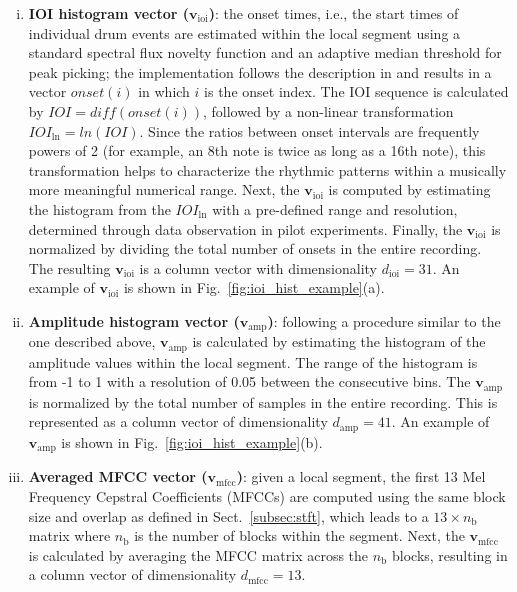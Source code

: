 \documentclass{ws-ijsc}
\begin{document}
\begin{enumerate}[(i)]
    \item   \textbf{IOI histogram vector ($\mathbf{v}_\mathrm{ioi}$)}: the onset times, i.e., the start times of individual drum events are estimated within the local segment using a standard spectral flux novelty function and an adaptive median threshold for peak picking; the implementation follows the description in \cite{Lerch2012} and results in a vector $onset(i)$ in which $i$ is the onset index. The IOI sequence is calculated by $IOI = diff(onset(i))$, followed by a non-linear transformation $IOI_\mathrm{ln} = ln(IOI)$. Since the ratios between onset intervals are frequently powers of 2 (for example, an 8th note is twice as long as a 16th note), this transformation helps to characterize the rhythmic patterns within a musically more meaningful numerical range. Next, the $\mathbf{v}_\mathrm{ioi}$ is computed by estimating the histogram from the $IOI_\mathrm{ln}$ with a pre-defined range and resolution, determined through data observation in pilot experiments. Finally, the $\mathbf{v}_\mathrm{ioi}$ is normalized by dividing the total number of onsets in the entire recording. The resulting $\mathbf{v}_\mathrm{ioi}$ is a column vector with dimensionality $d_\mathrm{ioi} = 31$. An example of  $\mathbf{v}_\mathrm{ioi}$ is shown in Fig.~\ref{fig:ioi_hist_example}(a).

    \item   \textbf{Amplitude histogram vector ($\mathbf{v}_\mathrm{amp}$)}: following a procedure similar to the one described above, $\mathbf{v}_\mathrm{amp}$ is calculated by estimating the histogram of the amplitude values within the local segment. The range of the histogram is from -1 to 1 with a resolution of 0.05 between the consecutive bins. The $\mathbf{v}_\mathrm{amp}$ is normalized by the total number of samples in the entire recording. This is represented as a column vector of dimensionality $d_\mathrm{amp} = 41$. An example of  $\mathbf{v}_\mathrm{amp}$ is shown in Fig.~\ref{fig:ioi_hist_example}(b).

    \item   \textbf{Averaged MFCC vector ($\mathbf{v}_\mathrm{mfcc}$)}: given a local segment, the first 13 Mel Frequency Cepstral Coefficients (MFCCs) are computed using the same block size and overlap as defined in Sect.~\ref{subsec:stft}, which leads to a $13 \times n_\mathrm{b}$ matrix where $n_\mathrm{b}$ is the number of blocks within the segment. Next, the $\mathbf{v}_\mathrm{mfcc}$ is calculated by averaging the MFCC matrix across the $n_\mathrm{b}$ blocks, resulting in a column vector of dimensionality $d_\mathrm{mfcc} = 13$. 
\end{enumerate} 
\end{document}
